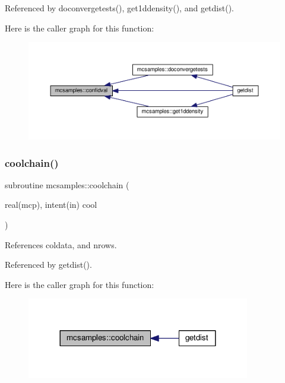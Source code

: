 Referenced by doconvergetests(), get1ddensity(), and getdist().

Here is the caller graph for this function\+:
\nopagebreak
\begin{figure}[H]
\begin{center}
\leavevmode
\includegraphics[width=350pt]{namespacemcsamples_affe201ec04f01f217a706350334d21e4_icgraph}
\end{center}
\end{figure}
\mbox{\label{namespacemcsamples_a415388e77f0a5360c5a814c8ba0e4080}} 
\subsubsection{\texorpdfstring{coolchain()}{coolchain()}}
{\footnotesize\ttfamily subroutine mcsamples\+::coolchain (\begin{DoxyParamCaption}\item[{real(mcp), intent(in)}]{cool }\end{DoxyParamCaption})}



References coldata, and nrows.



Referenced by getdist().

Here is the caller graph for this function\+:
\nopagebreak
\begin{figure}[H]
\begin{center}
\leavevmode
\includegraphics[width=276pt]{namespacemcsamples_a415388e77f0a5360c5a814c8ba0e4080_icgraph}
\end{center}
\end{figure}
\mbox{\label{namespacemcsamples_ab816e54fd85d1f1c125d828e843a2343}} 
